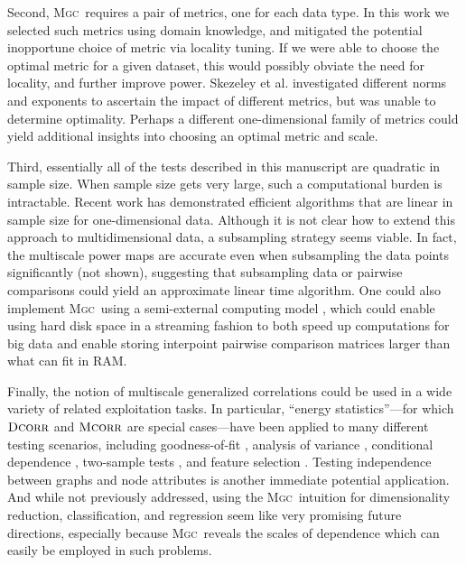 \documentclass[11pt]{article}
\providecommand{\sct}[1]{{\normalfont\textsc{#1}}}
\newcommand{\Mgc}{\sct{Mgc}}
\newcommand{\Dcorr}{\sct{Dcorr}}
\newcommand{\Mcorr}{\sct{Mcorr}}
\begin{document}
Second, \Mgc~requires a pair of metrics, one for each data type. In this work we selected such metrics using domain knowledge, and mitigated the potential inopportune choice of metric via locality tuning.  If we were able to choose the optimal metric for a given dataset, this would possibly obviate the need for locality, and further improve power. Skezeley et al. investigated different norms and exponents to ascertain the impact of different metrics, but was unable to determine optimality.
Perhaps a different one-dimensional family of metrics could yield additional insights into choosing an optimal metric and scale.

Third, essentially all of the tests described in this manuscript are quadratic in sample size.  When sample size gets very large, such a computational burden is intractable.  Recent work has demonstrated efficient algorithms that are linear in sample size \cite{Huo2016} for one-dimensional data.  Although it is not clear how to extend this approach to multidimensional data, a subsampling strategy seems viable.  In fact, the multiscale power maps are accurate even when subsampling the data points significantly (not shown), suggesting that subsampling data or pairwise comparisons  could yield an approximate linear time algorithm.  One could also implement \Mgc~using a semi-external computing model \cite{Zheng2016},  which could enable using hard disk space in a streaming fashion to both speed up computations for big data and enable storing interpoint pairwise comparison matrices larger than what can fit in RAM.

Finally, the notion of multiscale generalized correlations could be used in a wide variety of related exploitation tasks.  In particular, ``energy statistics''---for which $\Dcorr$ and $\Mcorr$ are special cases---have been applied to many different testing scenarios, including goodness-of-fit  \cite{Szekely2005}, analysis of variance  \cite{Rizzo2010}, conditional dependence  \cite{Szekely2014,Wang2015},  two-sample tests \cite{Szekely2004}, and feature selection \cite{LiZhongZhu2012,Zhong2015}.   
Testing independence between graphs and node attributes \cite{Fosdick2015} is another immediate potential application.  And while not previously addressed, using the \Mgc~intuition for dimensionality reduction, classification, and regression seem like very promising future directions, especially because \Mgc~reveals the scales of dependence which can easily be employed in such problems.
\end{document}

